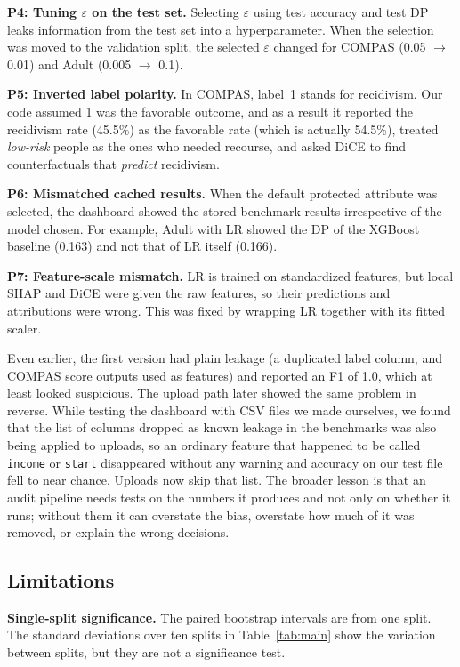 \documentclass[conference]{IEEEtran}
\newcommand{\eps}{\varepsilon}
\begin{document}
\textbf{P4: Tuning $\eps$ on the test set.} Selecting $\eps$ using test accuracy and test DP leaks information from the test set into a hyperparameter. When the selection was moved to the validation split, the selected $\eps$ changed for COMPAS (0.05 $\to$ 0.01) and Adult (0.005 $\to$ 0.1).

\textbf{P5: Inverted label polarity.} In COMPAS, label~1 stands for recidivism. Our code assumed 1 was the favorable outcome, and as a result it reported the recidivism rate (45.5\%) as the favorable rate (which is actually 54.5\%), treated \emph{low-risk} people as the ones who needed recourse, and asked DiCE to find counterfactuals that \emph{predict} recidivism.

\textbf{P6: Mismatched cached results.} When the default protected attribute was selected, the dashboard showed the stored benchmark results irrespective of the model chosen. For example, Adult with LR showed the DP of the XGBoost baseline (0.163) and not that of LR itself (0.166).

\textbf{P7: Feature-scale mismatch.} LR is trained on standardized features, but local SHAP and DiCE were given the raw features, so their predictions and attributions were wrong. This was fixed by wrapping LR together with its fitted scaler.

Even earlier, the first version had plain leakage (a duplicated label column, and COMPAS score outputs used as features) and reported an F1 of 1.0, which at least looked suspicious. The upload path later showed the same problem in reverse. While testing the dashboard with CSV files we made ourselves, we found that the list of columns dropped as known leakage in the benchmarks was also being applied to uploads, so an ordinary feature that happened to be called \texttt{income} or \texttt{start} disappeared without any warning and accuracy on our test file fell to near chance. Uploads now skip that list. The broader lesson is that an audit pipeline needs tests on the numbers it produces and not only on whether it runs; without them it can overstate the bias, overstate how much of it was removed, or explain the wrong decisions.

\subsection{Limitations}\label{sec:limits}
\textbf{Single-split significance.} The paired bootstrap intervals are from one split. The standard deviations over ten splits in Table~\ref{tab:main} show the variation between splits, but they are not a significance test.
\end{document}
